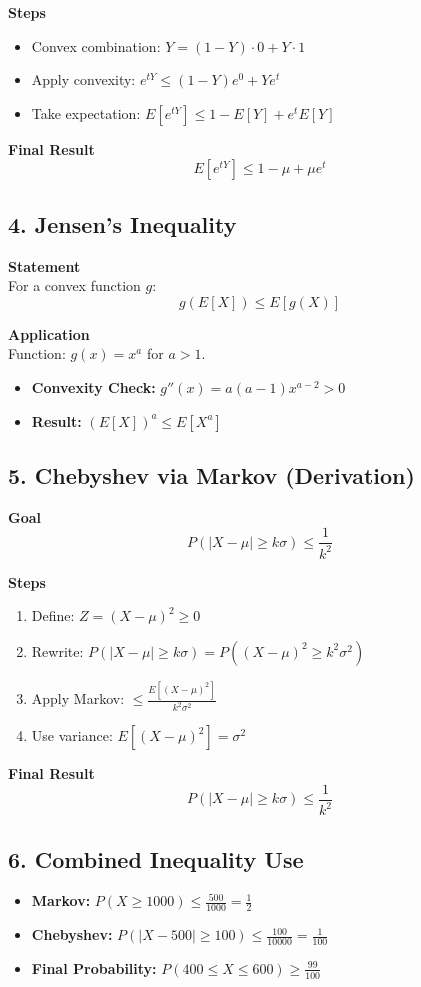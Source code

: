 \documentclass{article}
\begin{document}
\textbf{Steps}
\begin{itemize}
    \item Convex combination: $Y = (1-Y)\cdot 0 + Y \cdot 1$
    \item Apply convexity: $e^{tY} \le (1-Y)e^0 + Ye^t$
    \item Take expectation: $E[e^{tY}] \le 1 - E[Y] + e^t E[Y]$
\end{itemize}

\textbf{Final Result}
\[ E[e^{tY}] \le 1 - \mu + \mu e^t \]

\subsection*{4. Jensen’s Inequality}
\textbf{Statement} \\
For a convex function $g$:
\[ g(E[X]) \le E[g(X)] \]

\textbf{Application} \\
Function: $g(x) = x^a$ for $a > 1$.
\begin{itemize}
    \item \textbf{Convexity Check:} $g''(x) = a(a-1)x^{a-2} > 0$
    \item \textbf{Result:} $(E[X])^a \le E[X^a]$
\end{itemize}

\subsection*{5. Chebyshev via Markov (Derivation)}
\textbf{Goal}
\[ P(|X - \mu| \ge k\sigma) \le \frac{1}{k^2} \]

\textbf{Steps}
\begin{enumerate}
    \item Define: $Z = (X - \mu)^2 \ge 0$
    \item Rewrite: $P(|X-\mu|\ge k\sigma) = P((X-\mu)^2 \ge k^2\sigma^2)$
    \item Apply Markov: $\le \frac{E[(X-\mu)^2]}{k^2\sigma^2}$
    \item Use variance: $E[(X-\mu)^2] = \sigma^2$
\end{enumerate}

\textbf{Final Result}
\[ P(|X - \mu| \ge k\sigma) \le \frac{1}{k^2} \]

\subsection*{6. Combined Inequality Use}
\begin{itemize}
    \item \textbf{Markov:} $P(X \ge 1000) \le \frac{500}{1000} = \frac{1}{2}$
    \item \textbf{Chebyshev:} $P(|X - 500| \ge 100) \le \frac{100}{10000} = \frac{1}{100}$
    \item \textbf{Final Probability:} $P(400 \le X \le 600) \ge \frac{99}{100}$
\end{itemize}
\end{document}
